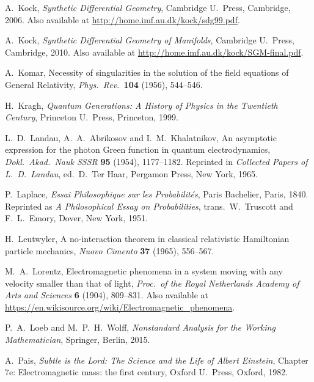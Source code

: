 \documentclass[12pt]{article}
\begin{document}
\begin{thebibliography}{10}
 A.\ Kock, \textsl{Synthetic Differential Geometry}, 
Cambridge U.\ Press, Cambridge, 2006.  Also available at 
\href{http://home.imf.au.dk/kock/sdg99.pdf}{http://home.imf.au.dk/kock/sdg99.pdf}.

 A.\ Kock, \textsl{Synthetic Differential Geometry of Manifolds},
Cambridge U.\ Press, Cambridge, 2010.  Also available at 
\href{http://home.imf.au.dk/kock/SGM-final.pdf}{http://home.imf.au.dk/kock/SGM-final.pdf}.

 A.\ Komar, Necessity of singularities in the solution of the field equations of General Relativity, \textsl{Phys.\ Rev.\ }\textbf{104} (1956), 544--546.

 H.\ Kragh, \textsl{Quantum Generations: A History of Physics in the Twentieth Century}, Princeton U.\ Press, Princeton, 1999.
 
 L.\ D.\ Landau, A.\ A.\ Abrikosov and I.\ M.\ Khalatnikov, An asymptotic expression for the photon Green function in quantum electrodynamics, \textsl{Dokl.\ Akad.\ Nauk SSSR} \textbf{95} (1954), 1177--1182.  Reprinted in \textsl{Collected Papers of L.\ D.\ Landau}, ed.\ D.\ Ter Haar, Pergamon Press, New York, 1965.

 P.\ Laplace, \textsl{Essai Philosophique sur les Probabilit\'es},  Paris Bachelier, Paris, 1840.  Reprinted as \textsl{A Philosophical Essay on Probabilities}, trans.\ W.\ Truscott and F.\ L.\ Emory, Dover, New York, 1951.

  H.\ Leutwyler, A no-interaction theorem in classical relativistic Hamiltonian particle mechanics, \textsl{Nuovo Cimento} \textbf{37} (1965), 556--567.

 M.\ A.\ Lorentz, Electromagnetic phenomena in a system moving with any velocity smaller than that of light, \textsl{Proc.\ of the Royal Netherlands Academy of Arts and Sciences }{\bf 6} (1904), 809–831.  Also available at \href{https://en.wikisource.org/wiki/Electromagnetic_phenomena}{https://en.wikisource.org/wiki/Electromagnetic\_phenomena}.

  P.\ A.\ Loeb and M.\ P.\ H.\ Wolff, \textsl{Nonstandard Analysis for the Working Mathematician}, Springer, Berlin, 2015.

 A.\ Pais,  \textsl{Subtle is the Lord: The Science and the Life of Albert Einstein}, Chapter 7e: Electromagnetic mass: the first century, Oxford U.\ Press, Oxford, 1982.  


\end{thebibliography}
\end{document}
